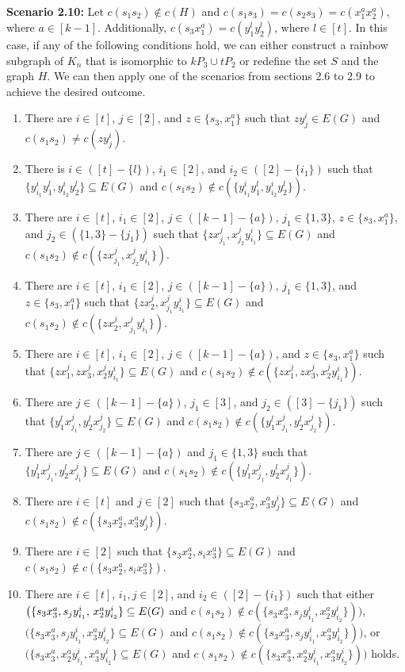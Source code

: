 \documentclass[12pt]{article}
\begin{document}
 {\bf Scenario 2.10:} Let \(c(s_1s_2) \notin c(H)\) and \(c(s_1s_3) = c(s_2s_3) = c(x^a_1x^a_2)\), where \(a \in [k-1]\). Additionally, \(c(s_3x^a_1) = c(y^l_1y^l_2)\), where \(l \in [t]\).
In this case, if any of the following conditions hold, we can either construct a rainbow subgraph of \(K_n\) that is isomorphic to \(kP_3 \cup tP_2\) or redefine the set \(S\) and the graph \(H\). We can then apply one of the scenarios from sections 2.6 to 2.9 to achieve the desired outcome.
 \begin{enumerate}
   \item There are $i\in[t]$, $j\in[2]$, and $z\in\{s_3,x^a_1\}$ such that $zy^i_j\in E(G)$ and $c(s_1s_2)\neq c(zy^i_j)$. 
    \item There is $i\in([t]-\{l\})$, $i_1\in[2]$, and $i_2\in([2]-\{i_1\})$ such that $\{y^i_{i_1}y^l_{1},y^i_{i_2}y^l_{2}\}\subseteq E(G)$ and $c(s_1s_2)\not\in c(\{y^i_{i_1}y^l_{1},y^i_{i_2}y^l_{2}\})$.
   \item There are $i\in[t]$, $i_1\in[2]$, $j\in([k-1]-\{a\})$, $j_1\in\{1,3\}$, $z\in\{s_3,x_1^a\}$, and $j_2\in(\{1,3\}-\{j_1\})$ such that $\{zx^j_{j_1},x^j_{j_2}y^i_{i_1}\}\subseteq E(G)$ and $c(s_1s_2)\not\in c(\{zx^j_{j_1},x^j_{j_2}y^i_{i_1}\})$.
   \item There are $i\in[t]$, $i_1\in[2]$, $j\in([k-1]-\{a\})$, $j_1\in\{1,3\}$, and $z\in\{s_3,x_1^a\}$ such that $\{zx^j_{2},x^j_{j_1}y^i_{i_1}\}\subseteq E(G)$ and $c(s_1s_2)\not\in c(\{zx^j_{2},x^j_{j_1}y^i_{i_1}\})$.
   \item There are $i\in[t]$, $i_1\in[2]$, $j\in([k-1]-\{a\})$, and $z\in\{s_3,x_1^a\}$ such that $\{zx^j_{1},zx^j_3,x^j_{2}y^i_{i_1}\}\subseteq E(G)$ and $c(s_1s_2)\not\in c(\{zx^j_{1},zx^j_3,x^j_{2}y^i_{i_1}\})$.
   \item There are $j\in([k-1]-\{a\})$, $j_1\in[3]$, and $j_2\in([3]-\{j_1\})$ such that $\{y^l_1x^j_{j_1},y^l_2x^j_{j_2}\}\subseteq E(G)$ and $c(s_1s_2)\not\in c(\{y^l_1x^j_{j_1},y^l_2x^j_{j_2}\})$.
  \item There are $j\in([k-1]-\{a\})$ and $j_1\in\{1,3\}$ such that $\{y^l_1x^j_{j_1},y^l_2x^j_{j_1}\}\subseteq E(G)$ and $c(s_1s_2)\not\in c(\{y^l_1x^j_{j_1},y^l_2x^j_{j_1}\})$.
  \item There are $i\in[t]$ and $j\in[2]$ such that $\{s_3x^a_{2},x^a_3y^i_{j}\}\subseteq E(G)$ and $c(s_1s_2)\not\in c(\{s_3x^a_{2},x^a_3y^i_{j}\})$.
  \item There are $i\in[2]$ such that $\{s_3x^a_{2},s_ix^a_3\}\subseteq E(G)$ and $c(s_1s_2)\not\in c(\{s_3x^a_{2},s_ix^a_3\})$.
  \item There are  \(i\in[t]\), \(i_1,j\in[2]\), and \(i_2\in([2]-\{i_1\})\) such that either \(\big(\{s_3x^a_3,s_jy^i_{i_1},$ $x^a_2y^i_{i_2}\}\subseteq E(G)\) and $c(s_1s_2)\not\in c(\{s_3x^a_3,s_jy^i_{i_1},x^a_2y^i_{i_2}\})\big)$, \(\big(\{s_3x^a_3,s_jy^i_{i_1},x^a_3y^i_{i_2}\}\subseteq E(G)\) and $c(s_1s_2)\not\in c(\{s_3x^a_3,s_jy^i_{i_1},x^a_3y^i_{i_2}\})\big)$, or \(\big(\{s_3x^a_3,x^a_2y^i_{i_1},x^a_3y^i_{i_2}\}\subseteq E(G)\) and  $c(s_1s_2)\not\in c(\{s_3x^a_3,x^a_2y^i_{i_1},x^a_3y^i_{i_2}\})\big)$ holds.

\end{enumerate}
\end{document}
